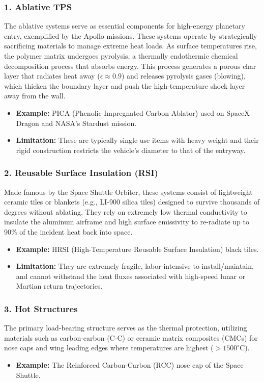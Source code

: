 \subsubsection*{1. Ablative TPS}
The ablative systems serve as essential components for high-energy planetary entry, exemplified by the Apollo missions. These systems operate by strategically sacrificing materials to manage extreme heat loads. As surface temperatures rise, the polymer matrix undergoes pyrolysis, a thermally endothermic chemical decomposition process that absorbs energy. This process generates a porous char layer that radiates heat away ($\epsilon \approx 0.9$) and releases pyrolysis gases (blowing), which thicken the boundary layer and push the high-temperature shock layer away from the wall.
\begin{itemize}
    \item \textbf{Example:} PICA (Phenolic Impregnated Carbon Ablator) used on SpaceX Dragon and NASA's Stardust mission.

    \item \textbf{Limitation:} These are typically single-use items with heavy weight and their rigid construction restricts the vehicle's diameter to that of the entryway.
\end{itemize}

\subsubsection*{2. Reusable Surface Insulation (RSI)}
Made famous by the Space Shuttle Orbiter, these systems consist of lightweight ceramic tiles or blankets (e.g., LI-900 silica tiles) designed to survive thousands of degrees without ablating. They rely on extremely low thermal conductivity to insulate the aluminum airframe and high surface emissivity to re-radiate up to 90\% of the incident heat back into space.
\begin{itemize}
    \item \textbf{Example:} HRSI (High-Temperature Reusable Surface Insulation) black tiles.

    \item \textbf{Limitation:} They are extremely fragile, labor-intensive to install/maintain, and cannot withstand the heat fluxes associated with high-speed lunar or Martian return trajectories.
\end{itemize}

\subsubsection*{3. Hot Structures}
The primary load-bearing structure serves as the thermal protection, utilizing materials such as carbon-carbon (C-C) or ceramic matrix composites (CMCs) for nose caps and wing leading edges where temperatures are highest ($> 1500^\circ$C).
\begin{itemize}
    \item \textbf{Example:} The Reinforced Carbon-Carbon (RCC) nose cap of the Space Shuttle.
\end{itemize}

